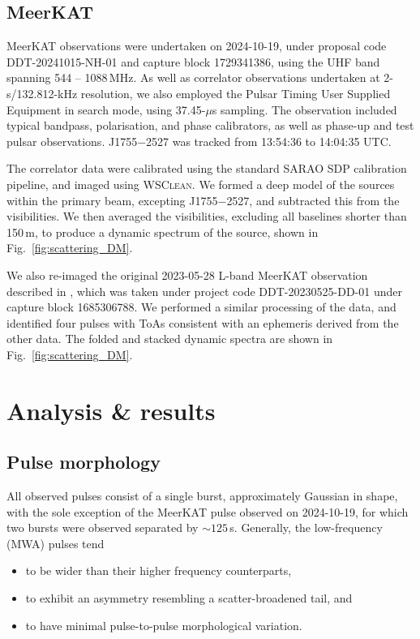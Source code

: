 \documentclass[fleqn,usenatbib]{mnras}
\newcommand{\src}{J1755$-$2527}
\newcommand{\Fig}{Fig.}
\begin{document}
\subsection{MeerKAT} \label{sec:meerkat}

MeerKAT observations were undertaken on 2024-10-19, under proposal code 
DDT-20241015-NH-01 and capture block 1729341386, using the UHF band spanning 544 -- 1088\,MHz. As well as correlator observations undertaken at 2-s/132.812-kHz resolution, we also employed the Pulsar Timing User Supplied Equipment \citep[PTUSE;][]{2020PASA...37...28B} in search mode, using 37.45-$\mu$s sampling. The observation included typical bandpass, polarisation, and phase calibrators, as well as phase-up and test pulsar observations. \src{} was tracked from 13:54:36 to 14:04:35 UTC.

The correlator data were calibrated using the standard SARAO SDP calibration pipeline, and imaged using \textsc{WSClean}. We formed a deep model of the sources within the primary beam, excepting \src{}, and subtracted this from the visibilities. We then averaged the visibilities, excluding all baselines shorter than 150\,m, to produce a dynamic spectrum of the source, shown in \Fig~\ref{fig:scattering_DM}.

We also re-imaged the original 2023-05-28 L-band MeerKAT observation described in , which was taken under project code DDT-20230525-DD-01 under capture block 1685306788. We performed a similar processing of the data, and identified four pulses with ToAs consistent with an ephemeris derived from the other data. The folded and stacked dynamic spectra are shown in \Fig~\ref{fig:scattering_DM}.


\section{Analysis \& results} \label{sec:analysis}

\subsection{Pulse morphology}

All observed pulses consist of a single burst, approximately Gaussian in shape, with the sole exception of the MeerKAT pulse observed on 2024-10-19, for which two bursts were observed separated by ${\sim}125\,$s.
Generally, the low-frequency (MWA) pulses tend
\begin{itemize}
    \item to be wider than their higher frequency counterparts,
    \item to exhibit an asymmetry resembling a scatter-broadened tail, and
    \item to have minimal pulse-to-pulse morphological variation.
\end{itemize}
\end{document}
